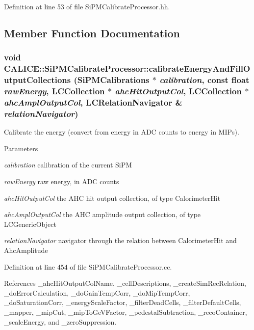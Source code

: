 Definition at line 53 of file SiPMCalibrateProcessor.hh.

\subsection{Member Function Documentation}
\subsubsection[{calibrateEnergyAndFillOutputCollections}]{\setlength{\rightskip}{0pt plus 5cm}void CALICE::SiPMCalibrateProcessor::calibrateEnergyAndFillOutputCollections (SiPMCalibrations $\ast$ {\em calibration}, \/  const float {\em rawEnergy}, \/  LCCollection $\ast$ {\em ahcHitOutputCol}, \/  LCCollection $\ast$ {\em ahcAmplOutputCol}, \/  LCRelationNavigator \& {\em relationNavigator})\hspace{0.3cm}{\ttfamily  [protected]}}\label{classCALICE_1_1SiPMCalibrateProcessor_a21e550aa165c9a32c585642c91f5b436}


Calibrate the energy (convert from energy in ADC counts to energy in MIPs). 
\begin{DoxyParams}{Parameters}
\item[{\em calibration}]calibration of the current SiPM \item[{\em rawEnergy}]raw energy, in ADC counts \item[{\em ahcHitOutputCol}]the AHC hit output collection, of type CalorimeterHit \item[{\em ahcAmplOutputCol}]the AHC amplitude output collection, of type LCGenericObject \item[{\em relationNavigator}]navigator through the relation between CalorimeterHit and AhcAmplitude \end{DoxyParams}


Definition at line 454 of file SiPMCalibrateProcessor.cc.

References \_\-ahcHitOutputColName, \_\-cellDescriptions, \_\-createSimRecRelation, \_\-doErrorCalculation, \_\-doGainTempCorr, \_\-doMipTempCorr, \_\-doSaturationCorr, \_\-energyScaleFactor, \_\-filterDeadCells, \_\-filterDefaultCells, \_\-mapper, \_\-mipCut, \_\-mipToGeVFactor, \_\-pedestalSubtraction, \_\-recoContainer, \_\-scaleEnergy, and \_\-zeroSuppression.

